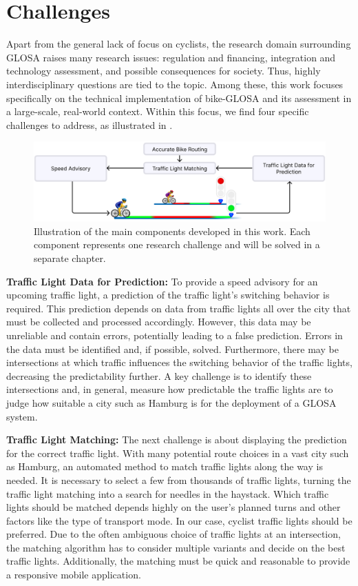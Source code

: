 \section{Challenges}

Apart from the general lack of focus on cyclists, the research domain surrounding GLOSA raises many research issues: regulation and financing, integration and technology assessment, and possible consequences for society. Thus, highly interdisciplinary questions are tied to the topic. Among these, this work focuses specifically on the technical implementation of bike-GLOSA and its assessment in a large-scale, real-world context. Within this focus, we find four specific challenges to address, as illustrated in .

\begin{figure}[t]
\centering
\includegraphics[width=\linewidth]{images/outline.png}
\caption{Illustration of the main components developed in this work. Each component represents one research challenge and will be solved in a separate chapter.}
\label{fig:outline}
\end{figure}

\textbf{\color{cidarkblue}Traffic Light Data for Prediction:} To provide a speed advisory for an upcoming traffic light, a prediction of the traffic light's switching behavior is required. This prediction depends on data from traffic lights all over the city that must be collected and processed accordingly. However, this data may be unreliable and contain errors, potentially leading to a false prediction. Errors in the data must be identified and, if possible, solved. Furthermore, there may be intersections at which traffic influences the switching behavior of the traffic lights, decreasing the predictability further. A key challenge is to identify these intersections and, in general, measure how predictable the traffic lights are to judge how suitable a city such as Hamburg is for the deployment of a GLOSA system.

\textbf{\color{cidarkblue}Traffic Light Matching:} The next challenge is about displaying the prediction for the correct traffic light. With many potential route choices in a vast city such as Hamburg, an automated method to match traffic lights along the way is needed. It is necessary to select a few from thousands of traffic lights, turning the traffic light matching into a search for needles in the haystack. Which traffic lights should be matched depends highly on the user's planned turns and other factors like the type of transport mode. In our case, cyclist traffic lights should be preferred. Due to the often ambiguous choice of traffic lights at an intersection, the matching algorithm has to consider multiple variants and decide on the best traffic lights. Additionally, the matching must be quick and reasonable to provide a responsive mobile application.

